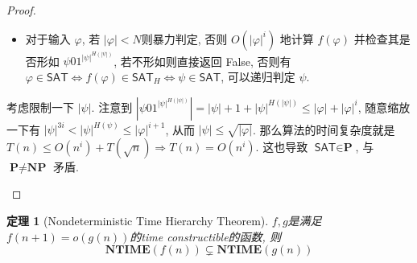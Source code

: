 \documentclass[8pt]{article}
\theoremstyle{compact}
\newtheorem{theorem}{定理}[section]
\def\le{\leqslant}
\def\NTIME{\textbf{NTIME}}
\def\P{\textbf{P}}
\def\NP{\textbf{NP}}
\begin{document}
\begin{proof}
\begin{itemize}
		\begin{itemize}
			\item 对于输入 $\varphi$, 若 $|\varphi| < N$则暴力判定, 否则 $O(|\varphi|^i)$ 地计算 $f(\varphi)$ 并检查其是否形如 $\psi01^{|\psi|^{H(|\psi|)}}$, 若不形如则直接返回 False, 否则有 $\varphi \in \textsf{SAT} \Leftrightarrow f(\varphi) \in \textsf{SAT}_H \Leftrightarrow \psi \in \textsf{SAT}$, 可以递归判定 $\psi$.
		\end{itemize}
		
		考虑限制一下 $|\psi|$. 注意到 $\left|\psi01^{|\psi|^{H(|\psi|)}}\right| = |\psi| + 1 + |\psi|^{H(|\psi|)} \le |\varphi| + |\varphi|^i$, 随意缩放一下有 $|\psi|^{3i} < |\psi|^{H(\psi)} \le |\varphi|^{i+1}$, 从而 $|\psi| \le \sqrt{|\varphi|}$. 那么算法的时间复杂度就是 $T(n) \le O(n^i) + T(\sqrt n) \Rightarrow T(n) = O(n^i)$. 这也导致 $\textsf{SAT} \in \P$, 与 $\P \neq \NP$ 矛盾.
	\end{itemize}
\end{proof}
\begin{theorem}[Nondeterministic Time Hierarchy Theorem]
	$f, g$是满足$f(n + 1) = o(g(n))$的time constructible的函数, 则
	$$\NTIME(f(n)) \subsetneq \NTIME(g(n))$$
\end{theorem}
\end{document}
